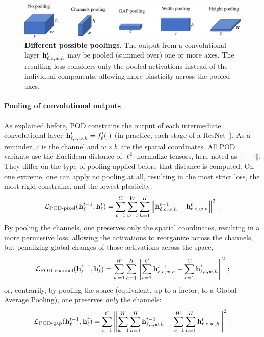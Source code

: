 \begin{figure}[tb]
    \begin{center}
        \includegraphics[width=0.90\linewidth]{images/podnet/pooling}
    \end{center}
    \caption{\textbf{Different possible poolings}. The output from a convolutional layer
        $\mathbf{h}^{t}_{\ell,c,w,h}$ may be pooled (summed over) one or more axes. The resulting loss
        considers only the pooled activations instead of the individual components, allowing more
        plasticity across the pooled axes.}
    \label{fig:pooling}
\end{figure}

\paragraph{Pooling of convolutional outputs} As explained before, POD constrains the output of each
intermediate convolutional layer $\mathbf{h}^{t}_{\ell,c,w,h} = f^{t}_\ell(\cdot)$ (in practice, each stage
of a ResNet~\cite{he2016resnet}). As a reminder, $c$ is the channel and $w\times h$ are the spatial
coordinates. All POD variants use the Euclidean distance of $\ell^2$-normalize tensors, here noted
as $\left\Vert\cdot-\cdot\right\Vert$. They differ on the type of pooling applied before that
distance is computed.
%
On one extreme, one can apply no pooling at all, resulting in the most strict loss, the most rigid
constrains, and the lowest plasticity:
%
\begin{equation}
    \mathcal{L}_{\text{POD-pixel}}(\mathbf{h}^{t-1}_\ell, \mathbf{h}^t_\ell) = \sum_{c=1}^C \sum_{w=1}^{W} \sum_{h=1}^{H} \left\Vert \mathbf{h}^{t-1}_{\ell,c,w,h} - \mathbf{h}^t_{\ell,c,w,h} \right\Vert^2\label{eq:pod_pixel}\,.
\end{equation}
%
By pooling the channels, one preserves only the spatial coordinates, resulting in a more permissive
loss, allowing the activations to reorganize across the channels, but penalizing global changes of
those activations across the space,
%
\begin{equation}
    \mathcal{L}_{\text{POD-channel}}(\mathbf{h}^{t-1}_\ell, \mathbf{h}^t_\ell)  = \sum_{w=1}^{W} \sum_{h=1}^{H} \left\Vert \sum_{c=1}^C \mathbf{h}^{t-1}_{\ell,c,w,h} - \sum_{c=1}^C \mathbf{h}^{t}_{\ell,c,w,h} \right\Vert^2\label{eq:pod_channel}\,;
\end{equation}
%
or, contrarily, by pooling the space (equivalent, up to a factor, to a Global Average Pooling), one
preserves \textit{only} the channels:
%
\begin{equation}
    \mathcal{L}_{\text{POD-gap}}(\mathbf{h}^{t-1}_\ell, \mathbf{h}^t_\ell) = \sum_{c=1}^{C} \left\Vert \sum_{w=1}^{W} \sum_{h=1}^H \mathbf{h}^{t-1}_{\ell,c,w,h} - \sum_{w=1}^{W} \sum_{h=1}^H \mathbf{h}^{t}_{\ell,c,w,h} \right\Vert^2\label{eq:pod_gap}\,.
\end{equation}
%

